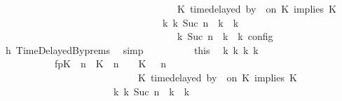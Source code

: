 \begin{isabellebody}
\ \ \ \ \ \ \ \ \ \ \ \ \ \ \ \ \ \ \ \ \ \ \ \ \ \ \ \ \ \ \ \ \ {\isasymturnstile}\ {\isasymPsi}\ {\isasymtriangleright}\ {\isacharparenleft}{\isacharparenleft}K\ time{\isacharminus}delayed\ by\ {\isasymdelta}{\isasymtau}\ on\ K\ implies\ K\ {\isacharhash}\ {\isasymPhi}{\isacharparenright}{\isacharparenright}\isanewline
\ \ \ \ \ \ \ \ \ \ \ \ \ \ \ \ \ \ \ \ \ \ \ \ \ \ \ \ \ \ \ \ \ {\isasymhookrightarrow}\isactrlbsup k\isactrlesup \ {\isacharparenleft}{\isasymGamma}\isactrlsub k{\isacharcomma}\ Suc\ n\ {\isasymturnstile}\ {\isasymPsi}\isactrlsub k\ {\isasymtriangleright}\ {\isasymPhi}\isactrlsub k{\isacharparenright}{\isacharparenright}\isanewline
\ \ \ \ \ \ \ \ \ \ \ \ \ \ \ \ \ \ \ \ \ \ \ \ \ \ \ \ \ \ \ \ {\isasymand}\ {\isasymrho}\ {\isasymin}\ {\isasymlbrakk}\ {\isasymGamma}\isactrlsub k{\isacharcomma}\ Suc\ n\ {\isasymturnstile}\ {\isasymPsi}\isactrlsub k\ {\isasymtriangleright}\ {\isasymPhi}\isactrlsub k\ {\isasymrbrakk}\isactrlsub c\isactrlsub o\isactrlsub n\isactrlsub f\isactrlsub i\isactrlsub g{\isacartoucheclose}\isanewline
\ \ \ \ \ \ \ \ \ \ \isamarkupfalse%
\ h{}\ TimeDelayedBy{\isachardot}prems\ \isamarkupfalse%
\ simp\isanewline
\ \ \ \ \ \ \ \ \isamarkupfalse%
\ this\ \isamarkupfalse%
\ {\isasymGamma}\isactrlsub k\ {\isasymPsi}\isactrlsub k\ {\isasymPhi}\isactrlsub k\ k\isanewline
\ \ \ \ \ \ \ \ \ \ \ fp{\isacharcolon}{\isacartoucheopen}{\isacharparenleft}{\isacharparenleft}{\isacharparenleft}K\ {\isasymUp}\ n{\isacharparenright}\ {\isacharhash}\ {\isacharparenleft}K\ {\isacharat}\ n\ {\isasymoplus}\ {\isasymdelta}{\isasymtau}\ {\isasymRightarrow}\ K\ {\isacharhash}\ {\isasymGamma}{\isacharparenright}{\isacharcomma}\ n\isanewline
\ \ \ \ \ \ \ \ \ \ \ \ \ \ \ \ \ \ \ \ \ \ \ \ \ {\isasymturnstile}\ {\isasymPsi}\ {\isasymtriangleright}\ {\isacharparenleft}{\isacharparenleft}K\ time{\isacharminus}delayed\ by\ {\isasymdelta}{\isasymtau}\ on\ K\ implies\ K\ {\isacharhash}\ {\isasymPhi}{\isacharparenright}{\isacharparenright}\isanewline
\ \ \ \ \ \ \ \ \ \ \ \ \ \ \ \ \ \ \ \ \ \ \ {\isasymhookrightarrow}\isactrlbsup k\isactrlesup \ {\isacharparenleft}{\isasymGamma}\isactrlsub k{\isacharcomma}\ Suc\ n\ {\isasymturnstile}\ {\isasymPsi}\isactrlsub k\ {\isasymtriangleright}\ {\isasymPhi}\isactrlsub k{\isacharparenright}{\isacartoucheclose}\isanewline

\end{isabellebody}
